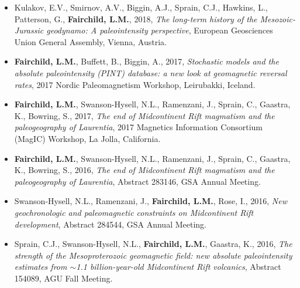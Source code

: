 \documentclass[11pt,a4paper,sans]{moderncv}        %
\begin{document}
\begin{itemize}

\vspace{6pt}

\item{Kulakov, E.V., Smirnov, A.V., Biggin, A.J., Sprain, C.J., Hawkins, L., Patterson, G., \textbf{Fairchild, L.M.}, 2018, \textit{The long-term history of the Mesozoic-Jurassic geodynamo: A paleointensity perspective}, European Geosciences Union General Assembly, Vienna, Austria.}

\vspace{3pt}

\item{\textbf{Fairchild, L.M.}, Buffett, B., Biggin, A., 2017, \textit{Stochastic models and the absolute paleointensity (PINT) database: a new look at geomagnetic reversal rates}, 2017 Nordic Paleomagnetism Workshop, Leirubakki, Iceland.}

\vspace{3pt}

\item{\textbf{Fairchild, L.M.}, Swanson-Hysell, N.L., Ramenzani, J., Sprain, C., Gaastra, K., Bowring, S., 2017, \textit{The end of Midcontinent Rift magmatism and the paleogeography of Laurentia}, 2017 Magnetics Information Consortium (MagIC) Workshop, La Jolla, California.}

\vspace{3pt}

\item{\textbf{Fairchild, L.M.}, Swanson-Hysell, N.L., Ramenzani, J., Sprain, C., Gaastra, K., Bowring, S., 2016, \textit{The end of Midcontinent Rift magmatism and the paleogeography of Laurentia}, Abstract 283146, GSA Annual Meeting.}

\vspace{3pt}

\item{Swanson-Hysell, N.L., Ramenzani, J., \textbf{Fairchild, L.M.}, Rose, I., 2016, \textit{New geochronologic and paleomagnetic constraints on Midcontinent Rift development}, Abstract 284544, GSA Annual Meeting.}

\vspace{3pt}

\item{Sprain, C.J., Swanson-Hysell, N.L., \textbf{Fairchild, L.M.}, Gaastra, K., 2016, \textit{The strength of the Mesoproterozoic geomagnetic field: new absolute paleointensity estimates from $\sim$1.1 billion-year-old Midcontinent Rift volcanics}, Abstract 154089, AGU Fall Meeting.}


\end{itemize}
\end{document}
